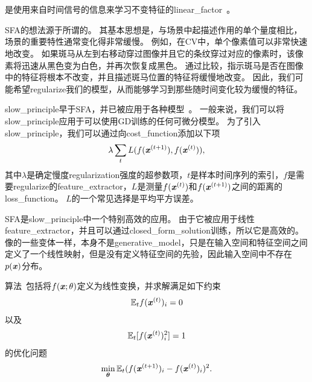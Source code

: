 \section{}
\label{sec:slow_feature_analysis}


是使用来自时间信号的信息来学习不变特征的\gls{linear_factor}~\citep{WisSej2002}。


\gls{SFA}的想法源于所谓的。
其基本思想是，与场景中起描述作用的单个量度相比，场景的重要特性通常变化得非常缓慢。
例如，在\gls{CV}中，单个像素值可以非常快速地改变。
如果斑马从左到右移动穿过图像并且它的条纹穿过对应的像素时，该像素将迅速从黑色变为白色，并再次恢复成黑色。
通过比较，指示斑马是否在图像中的特征将根本不改变，并且描述斑马位置的特征将缓慢地改变。
因此，我们可能希望\gls{regularize}我们的模型，从而能够学习到那些随时间变化较为缓慢的特征。


\gls{slow_principle}早于\gls{SFA}，并已被应用于各种模型~\citep{Hinton89b,Foldiak89,MobahiCollobertWestonICML2009,Bergstra+Bengio-2009}。
一般来说，我们可以将\gls{slow_principle}应用于可以使用\gls{GD}训练的任何可微分模型。 
为了引入\gls{slow_principle}，我们可以通过向\gls{cost_function}添加以下项
\begin{align}
\label{eqn:137}
\lambda \sum_t L(f(\boldsymbol{\mathit{x}}^{(t+1)}),f(\boldsymbol{\mathit{x}}^{(t)})),
\end{align}
其中$\lambda$是确定慢度\gls{regularization}强度的超参数项，$t$是样本时间序列的索引，$f$是需要\gls{regularize}的\gls{feature_extractor}，$L$是测量$f(\boldsymbol{\mathit{x}}^{(t)})$和$f(\boldsymbol{\mathit{x}}^{(t+1)})$之间的距离的\gls{loss_function}。
$L$的一个常见选择是平均平方误差。


\gls{SFA}是\gls{slow_principle}中一个特别高效的应用。
由于它被应用于线性\gls{feature_extractor}，并且可以通过\gls{closed_form_solution}训练，所以它是高效的。
像的一些变体一样，本身不是\gls{generative_model}，只是在输入空间和特征空间之间定义了一个线性映射，但是没有定义特征空间的先验，因此输入空间中不存在$p(\boldsymbol{\mathit{x}})$分布。


算法~\citep{WisSej2002}包括将$f(\boldsymbol{\mathit{x}};\theta)$定义为线性变换，并求解满足如下约束
\begin{align}
\label{eqn:139}
\mathbb{E}_t  f(\boldsymbol{\mathit{x}}^{(t)})_i = 0 
\end{align}
以及
\begin{align}
\label{eqn:1310}
\mathbb{E}_t [ f(\boldsymbol{\mathit{x}}^{(t)})_i^2 ] =1 
\end{align}
的优化问题
\begin{align}
\label{eqn:138}
\min_{\boldsymbol{\theta}} \mathbb{E}_t  (f(\boldsymbol{\mathit{x}}^{(t+1)})_i - f(\boldsymbol{\mathit{x}}^{(t)})_i  )^2.
\end{align}

